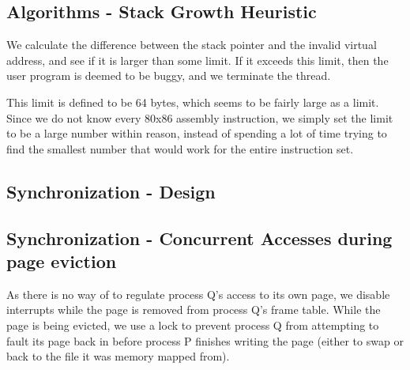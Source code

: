 
\subsection{Algorithms - Stack Growth Heuristic}


We calculate the difference between the stack pointer and the invalid virtual
address, and see if it is larger than some limit. If it exceeds this limit, then
the user program is deemed to be buggy, and we terminate the thread.

This limit is defined to be 64 bytes, which seems to be fairly large as a limit.
Since we do not know every 80x86 assembly instruction, we simply set the limit
to be a large number within reason, instead of spending a lot of time trying to
find the smallest number that would work for the entire instruction set.

\subsection{Synchronization - Design}


\subsection{Synchronization - Concurrent Accesses during page eviction}

As there is no way of to regulate process Q's access to its own page, we disable interrupts while the page is removed from process Q's frame table.
While the page is being evicted, we use a lock to prevent process Q from attempting to fault its page back in before process P finishes writing the page (either to swap or back to the file it was memory mapped from).

